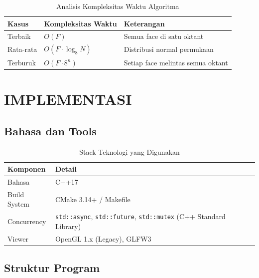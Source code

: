 \documentclass[12pt, a4paper]{report}
\begin{document}
\begin{table}[H]
  \centering
  \caption{Analisis Kompleksitas Waktu Algoritma}
  \label{tab:complexity}
  \begin{tabular}{lll}
    \toprule
    \textbf{Kasus} & \textbf{Kompleksitas Waktu} & \textbf{Keterangan} \\
    \midrule
    Terbaik  & $O(F)$                & Semua face di satu oktant \\
    Rata-rata & $O(F \cdot \log_8 N)$ & Distribusi normal permukaan \\
    Terburuk  & $O(F \cdot 8^n)$      & Setiap face melintas semua oktant \\
    \bottomrule
  \end{tabular}
\end{table}



\chapter{IMPLEMENTASI}

\section{Bahasa dan Tools}

\begin{table}[H]
  \centering
  \caption{Stack Teknologi yang Digunakan}
  \label{tab:tech}
  \begin{tabularx}{\textwidth}{lX}
    \toprule
    \textbf{Komponen} & \textbf{Detail} \\
    \midrule
    Bahasa       & C++17 \\
    Build System & CMake 3.14+ / Makefile \\
    Concurrency  & \texttt{std::async}, \texttt{std::future},
                   \texttt{std::mutex} (C++ Standard Library) \\
    Viewer       & OpenGL 1.x (Legacy), GLFW3 \\
    \bottomrule
  \end{tabularx}
\end{table}

\section{Struktur Program}
\end{document}
